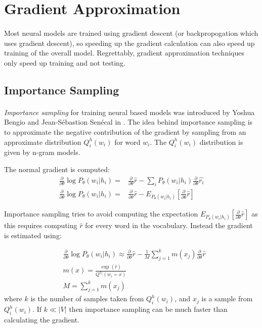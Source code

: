 \section{Gradient Approximation}
\paragraph{}
Most neural models are trained using gradient descent (or backpropogation which uses gradient descent), so speeding up the gradient calculation can also speed up training of the overall model. Regrettably, gradient approximation techniques only speed up training and not testing. 

\subsection{Importance Sampling}
\paragraph{}
\emph{Importance sampling} for training neural based models was introduced by Yoshua Bengio and Jean-S\'{e}bastion Sen\'{e}cal in \cite{BengioSenecal2003}.
The idea behind importance sampling is to approximate the negative contribution of the gradient by sampling from an approximate distribution $Q^h_i(w_i)$ for word $w_i$. The $Q^h_i(w_i)$ distribution is given by n-gram models. 

The normal gradient is computed:
\begin{align}
\frac{\partial}{\partial \theta} \log P_{\theta}(w_i| h_i) =& \frac{\partial}{\partial \theta} \hat{r} - \sum_i P_{\theta}(w_i| h_i) \frac{\partial}{\partial \theta} \hat{r_i} 
\\ \frac{\partial}{\partial \theta} \log P_{\theta}(w_i| h_i) =& \frac{\partial}{\partial \theta} \hat{r} - E_{P_{\theta}(w_i| h_i)} \left[ \frac{\partial}{\partial \theta} \hat{r} \right] \nonumber
\end{align}

Importance sampling tries to avoid computing the expectation $E_{P_{\theta}(w_i| h_i)} \left[ \frac{\partial}{\partial \theta} \hat{r} \right]$ as this requires computing $\hat{r}$ for every word in the vocabulary. Instead the gradient is estimated using:

\begin{align}
&\frac{\partial}{\partial \theta} \log P_{\theta}(w_i| h_i) \approx  \frac{\partial}{\partial \theta} \hat{r} - \frac{1}{M} \sum_{j=1}^k m(x_j) \frac{\partial}{\partial \theta} \hat{r}
\\ &m(x) =  \frac{\exp(\hat{r})}{Q^{h_i}(w_i=x)} \nonumber
\\ &M= \sum_{j=1}^k m(x_j) \nonumber
\end{align}
where $k$ is the number of samples taken from $Q^h_i(w_i)$, and $x_j$ is a sample from  $Q^h_i(w_i)$. If $k \ll |V|$ then importance sampling can be much faster than calculating the gradient.

